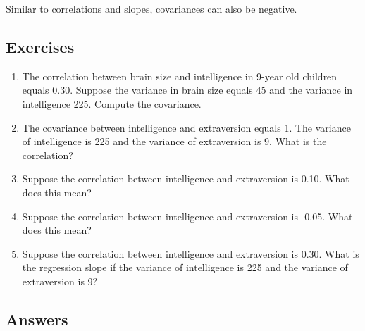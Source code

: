 \documentclass[]{report}\usepackage[]{graphicx}\usepackage[]{color}
\begin{document}
Similar to correlations and slopes, covariances can also be negative.


\subsection{Exercises}

\begin{enumerate}

\item The correlation between brain size and intelligence in 9-year old children equals 0.30. Suppose the variance in brain size equals 45 and the variance in intelligence 225. Compute the covariance.



\item The covariance between intelligence and extraversion equals 1. The variance of intelligence is 225 and the variance of extraversion is 9. What is the correlation?




\item Suppose the correlation between intelligence and extraversion is 0.10. What does this mean?



\item Suppose the correlation between intelligence and extraversion is -0.05. What does this mean?




\item Suppose the correlation between intelligence and extraversion is 0.30. What is the regression slope if the variance of intelligence is 225 and the variance of extraversion is 9?



\end{enumerate}

\subsection{Answers}
\end{document}
